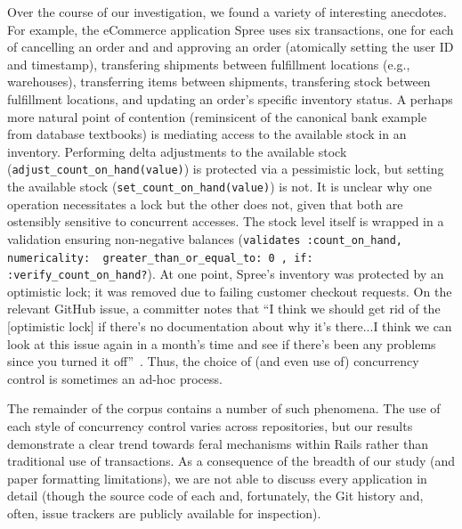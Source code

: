 Over the course of our investigation, we found a variety of
interesting anecdotes. For example, the eCommerce application Spree
uses six transactions, one for each of cancelling an order and and
approving an order (atomically setting the user ID and timestamp),
transfering shipments between fulfillment locations (e.g.,
warehouses), transferring items between shipments, transfering stock
between fulfillment locations, and updating an order's specific
inventory status. A perhaps more natural point of contention
(reminsicent of the canonical bank example from database textbooks) is
mediating access to the available stock in an inventory. Performing
delta adjustments to the available stock
(\texttt{adjust\_count\_on\_hand(value)}) is protected via a
pessimistic lock, but setting the available stock
(\texttt{set\_count\_on\_hand(value)}) is not. It is unclear why one
operation necessitates a lock but the other does not, given that both
are ostensibly sensitive to concurrent accesses. The stock level
itself is wrapped in a validation ensuring non-negative balances
(\texttt{validates :count\_on\_hand, numericality: {
    greater\_than\_or\_equal\_to: 0 }, if:
  :verify\_count\_on\_hand?}). At one point, Spree's inventory was
protected by an optimistic lock; it was removed due to failing
customer checkout requests. On the relevant GitHub issue, a committer
notes that ``I think we should get rid of the [optimistic lock] if
there's no documentation about why it's there...I think we can look at
this issue again in a month's time and see if there's been any
problems since you turned it off''~\cite{code-optimistic-issue}. Thus,
the choice of (and even use of) concurrency control is sometimes an
ad-hoc process.

The remainder of the corpus contains a number of such phenomena. The
use of each style of concurrency control varies across repositories,
but our results demonstrate a clear trend towards feral mechanisms
within Rails rather than traditional use of transactions. As a
consequence of the breadth of our study (and paper formatting
limitations), we are not able to discuss every application in detail
(though the source code of each and, fortunately, the Git history and,
often, issue trackers are publicly available for inspection).

